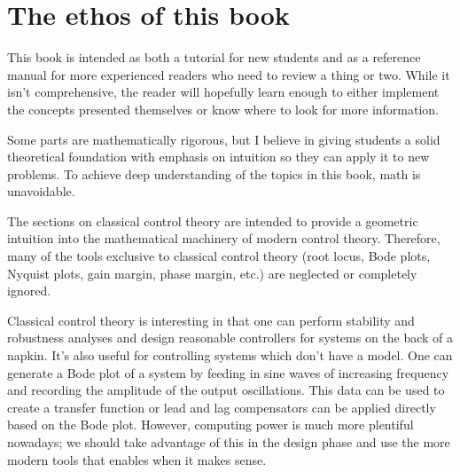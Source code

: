 \section{The ethos of this book}

This book is intended as both a tutorial for new students and as a reference
manual for more experienced readers who need to review a thing or two. While it
isn't comprehensive, the reader will hopefully learn enough to either implement
the concepts presented themselves or know where to look for more information.

Some parts are mathematically rigorous, but I believe in giving students a solid
theoretical foundation with emphasis on intuition so they can apply it to new
problems. To achieve deep understanding of the topics in this book, math is
unavoidable.

The sections on classical control theory are intended to provide a geometric
intuition into the mathematical machinery of modern control theory. Therefore,
many of the tools exclusive to classical control theory (root locus, Bode plots,
Nyquist plots, gain margin, phase margin, etc.) are neglected or completely
ignored.

Classical control theory is interesting in that one can perform stability and
robustness analyses and design reasonable controllers for systems on the back of
a napkin. It's also useful for controlling systems which don't have a model. One
can generate a Bode plot of a system by feeding in sine waves of increasing
frequency and recording the amplitude of the output oscillations. This data can
be used to create a transfer function or lead and lag compensators can be
applied directly based on the Bode plot. However, computing power is much more
plentiful nowadays; we should take advantage of this in the design phase and use
the more modern tools that enables when it makes sense.
